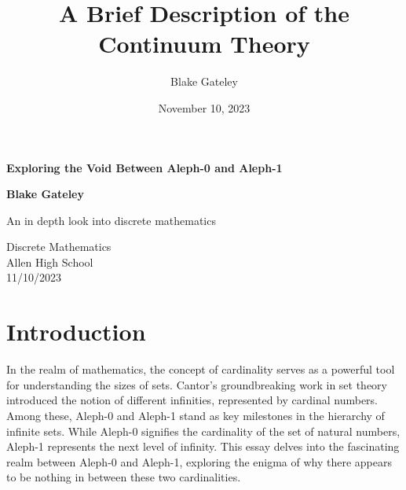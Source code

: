 \documentclass[12pt]{article}
\title{A Brief Description of the Continuum Theory}
\author{Blake Gateley}
\date{November 10, 2023}
\begin{document}
\begin{titlepage}
   \begin{center}
       \vspace*{1cm}

       {\Huge \textbf{Exploring the Void Between Aleph-0 and Aleph-1}}

       \vspace{0.5cm}
            
       \vspace{1.5cm}

       \textbf{Blake Gateley}


       
       \vfill
            
       An in depth look into discrete mathematics
            
       \vspace{0.8cm}
     
   
            
       Discrete Mathematics\\
       Allen High School\\
       11/10/2023
            
   \end{center}
\end{titlepage}
\tableofcontents

\newpage
\section{Introduction}


In the realm of mathematics, the concept of cardinality serves as a powerful tool for understanding the sizes of sets. Cantor's groundbreaking work in set theory introduced the notion of different infinities, represented by cardinal numbers. Among these, Aleph-0 and Aleph-1 stand as key milestones in the hierarchy of infinite sets. While Aleph-0 signifies the cardinality of the set of natural numbers, Aleph-1 represents the next level of infinity. This essay delves into the fascinating realm between Aleph-0 and Aleph-1, exploring the enigma of why there appears to be nothing in between these two cardinalities.



\pagebreak

\end{document}
